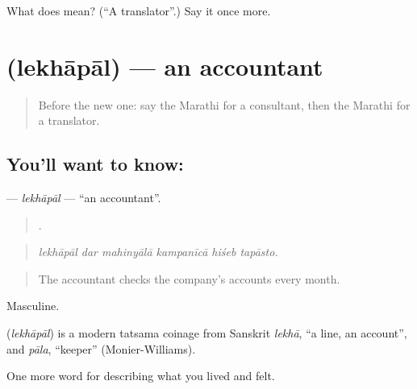\begin{tcolorbox}[breakable,colback=teal!4,colframe=teal!35!black,title={Before you move on}]
What does  mean? (\textquotedblleft{}A translator\textquotedblright{}.) Say it once more.
\end{tcolorbox}
\section[\texorpdfstring{\mr{लेखापाल} (lekhāpāl)}{लेखापाल (lekhāpāl)}]{ (lekhāpāl) — an accountant}

\label{lesson:MR-C515-lekhapal}



\begin{quote}
Before the new one: say the Marathi for a consultant, then the Marathi for a translator.
\end{quote}

\subsection*{You'll want to know: }
\textbf{} — \emph{lekhāpāl} — \textquotedblleft{}an accountant\textquotedblright{}.

\begin{quote}
     .
\end{quote}

\begin{quote}
\emph{lekhāpāl dar mahinyālā kampanīcā hiśeb tapāsto.}
\end{quote}

\begin{quote}
The accountant checks the company's accounts every month.
\end{quote}

Masculine.

\begin{cousinweb}
\textbf{} (\emph{lekhāpāl}) is a modern tatsama coinage from Sanskrit \emph{lekhā}, \textquotedblleft{}a line, an account\textquotedblright{}, and \emph{pāla}, \textquotedblleft{}keeper\textquotedblright{} (Monier-Williams).
\end{cousinweb}

\begin{grammarlens}[title={What you've built}]
One more word for describing what you lived and felt.
\end{grammarlens}

